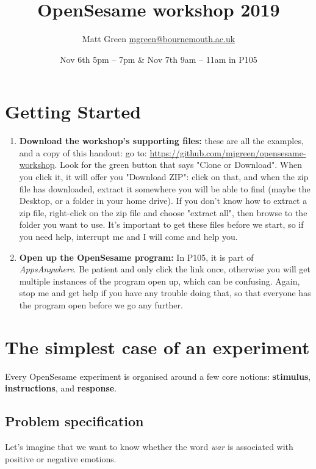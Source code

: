 \documentclass[a4paper]{tufte-handout}
\title{OpenSesame workshop 2019}%
\date{Nov 6th 5pm -- 7pm \& Nov 7th 9am -- 11am in P105}
\author{Matt Green \href{mailto:mgreen@bournemouth.ac.uk}{mgreen@bournemouth.ac.uk} }
\begin{document}

\maketitle
{}
\tableofcontents

\section{Getting Started}
\begin{enumerate}
\item \textbf{Download the workshop's supporting files:} these are  all the examples, and a copy of this handout: go to: \url{https://github.com/mjgreen/opensesame-workshop}. Look for the green button that says "Clone or Download". When you click it, it will offer you "Download ZIP": click on that, and when the zip file has downloaded, extract it somewhere you will be able to find (maybe the Desktop, or a folder in your home drive). If you don't know how to extract a zip file, right-click on the zip file and choose "extract all", then browse to the folder you want to use. It's important to get these files before we start, so if you need help, interrupt me and I will come and help you.
\item \textbf{Open up the OpenSesame program:} In P105, it is part of \emph{AppsAnywhere}. Be patient and only click the link once, otherwise you will get multiple instances of the program open up, which can be confusing. Again, stop me and get help if you have any trouble doing that, so that everyone has the program open before we go any further.
\end{enumerate}

\section{The simplest case of an experiment}
Every OpenSesame experiment is organised around a few core notions: \textbf{stimulus}, \textbf{instructions}, and \textbf{response}.

\subsection{Problem specification}
Let's imagine that we want to know whether the word \emph{war} is associated with positive or negative emotions.
\end{document}
